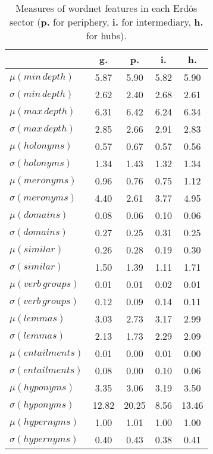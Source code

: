 \begin{table}[h!]
\begin{center}
\begin{tabular}{| l || c | c | c | c |}\hline
 & {\bf g.} & {\bf p.} & {\bf i.} & {\bf h.} \\\hline\hline
$\mu(min\,depth)$ & 5.87  & 5.90  & 5.82  & 5.90 \\
$\sigma(min\,depth)$ & 2.62  & 2.40  & 2.68  & 2.61 \\\hline
$\mu(max\,depth)$ & 6.31  & 6.42  & 6.24  & 6.34 \\
$\sigma(max\,depth)$ & 2.85  & 2.66  & 2.91  & 2.83 \\\hline
$\mu(holonyms)$ & 0.57  & 0.67  & 0.57  & 0.56 \\
$\sigma(holonyms)$ & 1.34  & 1.43  & 1.32  & 1.34 \\\hline
$\mu(meronyms)$ & 0.96  & 0.76  & 0.75  & 1.12 \\
$\sigma(meronyms)$ & 4.40  & 2.61  & 3.77  & 4.95 \\\hline
$\mu(domains)$ & 0.08  & 0.06  & 0.10  & 0.06 \\
$\sigma(domains)$ & 0.27  & 0.25  & 0.31  & 0.25 \\\hline
$\mu(similar)$ & 0.26  & 0.28  & 0.19  & 0.30 \\
$\sigma(similar)$ & 1.50  & 1.39  & 1.11  & 1.71 \\\hline
$\mu(verb\,groups)$ & 0.01  & 0.01  & 0.02  & 0.01 \\
$\sigma(verb\,groups)$ & 0.12  & 0.09  & 0.14  & 0.11 \\\hline
$\mu(lemmas)$ & 3.03  & 2.73  & 3.17  & 2.99 \\
$\sigma(lemmas)$ & 2.13  & 1.73  & 2.29  & 2.09 \\\hline
$\mu(entailments)$ & 0.01  & 0.00  & 0.01  & 0.00 \\
$\sigma(entailments)$ & 0.08  & 0.00  & 0.10  & 0.06 \\\hline
$\mu(hyponyms)$ & 3.35  & 3.06  & 3.19  & 3.50 \\
$\sigma(hyponyms)$ & 12.82  & 20.25  & 8.56  & 13.46 \\\hline
$\mu(hypernyms)$ & 1.00  & 1.01  & 1.00  & 1.00 \\
$\sigma(hypernyms)$ & 0.40  & 0.43  & 0.38  & 0.41 \\\hline
\end{tabular}
\caption{Measures of wordnet features in each Erd\"os sector ({{\bf p.}} for periphery, {{\bf i.}} for intermediary, {{\bf h.}} for hubs).}
\end{center}
\end{table}